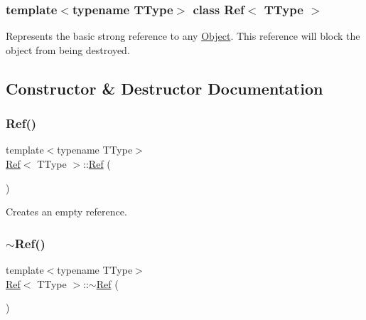 \subsubsection*{template$<$typename T\+Type$>$\newline
class Ref$<$ T\+Type $>$}

Represents the basic strong reference to any \mbox{\hyperlink{class_object}{Object}}. This reference will block the object from being destroyed. 



\subsection{Constructor \& Destructor Documentation}
\mbox{\label{class_ref_a73f8a459509492ff5281240d2eefb2d5}} 
\subsubsection{\texorpdfstring{Ref()}{Ref()}\hspace{0.1cm}{\footnotesize\ttfamily [1/6]}}
{\footnotesize\ttfamily template$<$typename T\+Type$>$ \\
\mbox{\hyperlink{class_ref}{Ref}}$<$ T\+Type $>$\+::\mbox{\hyperlink{class_ref}{Ref}} (\begin{DoxyParamCaption}{ }\end{DoxyParamCaption})\hspace{0.3cm}{\ttfamily [inline]}}



Creates an empty reference. 

\mbox{\label{class_ref_a51a02585d57ba2d0fd2066372ed422c8}} 
\subsubsection{\texorpdfstring{$\sim$Ref()}{~Ref()}}
{\footnotesize\ttfamily template$<$typename T\+Type$>$ \\
\mbox{\hyperlink{class_ref}{Ref}}$<$ T\+Type $>$\+::$\sim$\mbox{\hyperlink{class_ref}{Ref}} (\begin{DoxyParamCaption}{ }\end{DoxyParamCaption})\hspace{0.3cm}{\ttfamily [inline]}}



